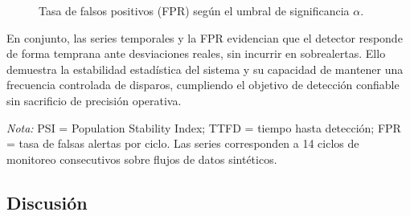 \begin{figure}[htbp]
\centering
{}
\caption{Tasa de falsos positivos (FPR) según el umbral de significancia $\alpha$.}
\label{fig:false-positives}
\end{figure}

\vspace{0.2cm}

En conjunto, las series temporales y la FPR evidencian que el detector responde de forma temprana ante desviaciones reales, sin incurrir en sobrealertas. 
Ello demuestra la estabilidad estadística del sistema y su capacidad de mantener una frecuencia controlada de disparos, cumpliendo el objetivo de detección confiable sin sacrificio de precisión operativa.

\noindent\footnotesize\emph{Nota:} PSI = Population Stability Index; TTFD = tiempo hasta detección; FPR = tasa de falsas alertas por ciclo. 
Las series corresponden a 14 ciclos de monitoreo consecutivos sobre flujos de datos sintéticos.
\normalsize


\subsection{Discusión}
